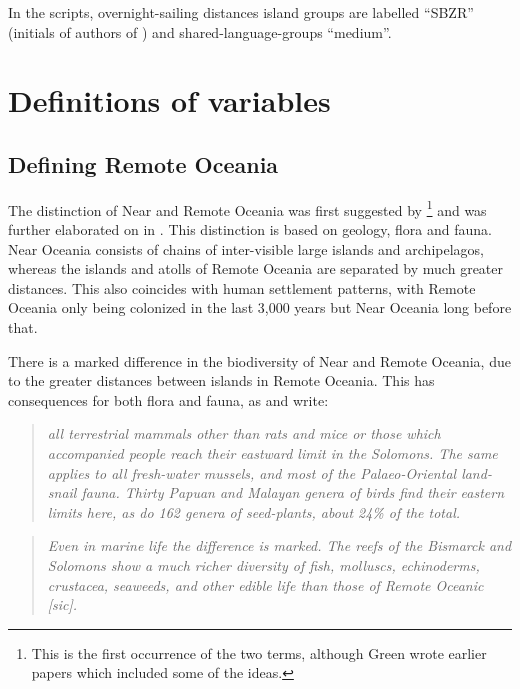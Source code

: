 \documentclass[unnumsec,webpdf,modern,medium]{oup-authoring-template}
\begin{document}
\begin{appendices}
In the scripts, overnight-sailing distances island groups are labelled ``SBZR'' (initials of authors of \cite{NZSA_overnight_2023}) and shared-language-groups ``medium''.

\section{Definitions of variables}

\FloatBarrier
\subsection{Defining Remote Oceania}
The distinction of Near and Remote Oceania was first suggested by \citet{pawley1973dating}\footnote{This is the first occurrence of the two terms, although Green wrote earlier papers which included some of the ideas.} and was further elaborated on in \citet{green1991near}. This distinction is based on geology, flora and fauna. Near Oceania consists of chains of inter-visible large islands and archipelagos, whereas the islands and atolls of Remote Oceania are separated by much greater distances. This also coincides with human settlement patterns, with Remote Oceania only being colonized in the last 3,000 years but Near Oceania long before that.

There is a marked difference in the biodiversity of Near and Remote Oceania, due to the greater distances between islands in Remote Oceania. This has consequences for both flora and fauna, as \citet{green1991near} and \citet{pawley2007locatingoceanic} write:

\begin{quotation}
\noindent \emph{all terrestrial mammals other than rats and mice or those which accompanied people reach their eastward limit in the Solomons. The same applies to all fresh-water mussels, and most of the Palaeo-Oriental land-snail fauna. Thirty Papuan and Malayan genera of birds find their eastern limits here, as do 162 genera of seed-plants, about 24\% of the total.}
\end{quotation}
\begin{flushright} \citet[495]{green1991near}
\end{flushright}

\begin{quotation}
\noindent \emph{Even in marine life the difference is marked. The reefs of the Bismarck and Solomons show a much richer diversity of fish, molluscs, echinoderms, crustacea, seaweeds, and other edible life than those of Remote Oceanic [sic].}
\end{quotation}
\begin{flushright}  \citet[19]{pawley2007locatingoceanic} \end{flushright}


\end{appendices}
\end{document}
